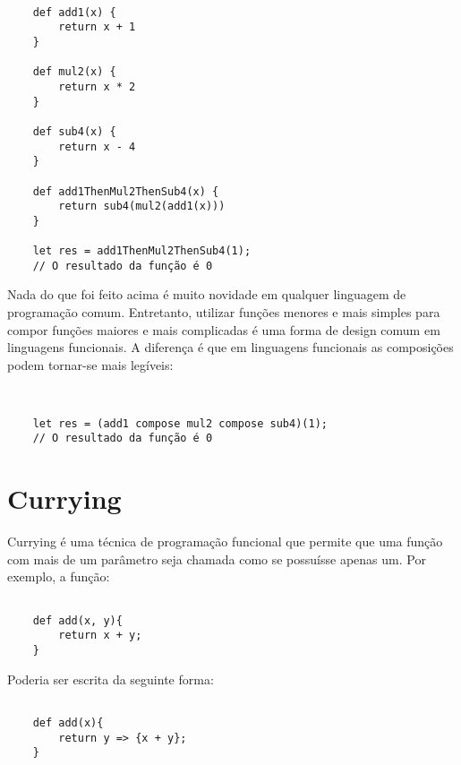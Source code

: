 \begin{lstlisting}[caption={Exemplo de Composição de Funções},label=fogex]

    def add1(x) {
        return x + 1
    }

    def mul2(x) {
        return x * 2
    }

    def sub4(x) {
        return x - 4
    }

    def add1ThenMul2ThenSub4(x) {
        return sub4(mul2(add1(x)))
    }

    let res = add1ThenMul2ThenSub4(1);
    // O resultado da função é 0

\end{lstlisting}

Nada do que foi feito acima é muito novidade em 
qualquer linguagem de programação comum. Entretanto, 
utilizar funções menores e mais simples para compor 
funções maiores e mais complicadas é uma forma de 
design comum em linguagens funcionais. A diferença é 
que em linguagens funcionais as composições podem 
tornar-se mais legíveis:

\begin{lstlisting}[caption={Exemplo de Composição de Funções},label=fogex]


    let res = (add1 compose mul2 compose sub4)(1);
    // O resultado da função é 0

\end{lstlisting}


\section{Currying}

Currying é uma técnica de programação funcional que 
permite que uma função com mais de um parâmetro seja 
chamada como se possuísse apenas um. Por exemplo, a 
função:

\begin{lstlisting}[caption={Exemplo sem Currying},label=nocurrex]

    def add(x, y){
        return x + y;
    }

\end{lstlisting}

Poderia ser escrita da seguinte forma:

\begin{lstlisting}[caption={Exemplo de Currying},label=currex]

    def add(x){
        return y => {x + y};
    }

\end{lstlisting}

